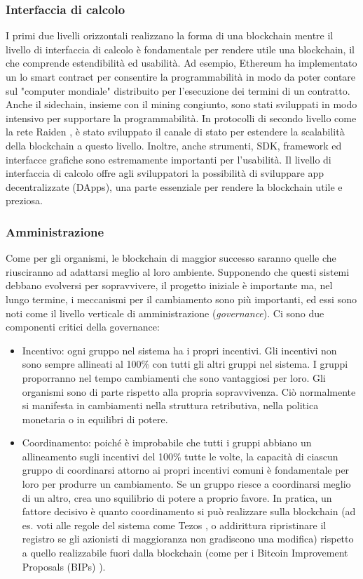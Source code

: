 \documentclass[a4paper,12pt]{article}
\begin{document}
\subsubsection{Interfaccia di calcolo}
I primi due livelli orizzontali realizzano la forma di una blockchain mentre il livello di interfaccia di calcolo è fondamentale per rendere utile una blockchain, il che comprende estendibilità ed usabilità. Ad esempio, Ethereum ha implementato un lo smart contract per
consentire la programmabilità in modo da poter contare sul "computer mondiale" distribuito per l'esecuzione dei termini di un contratto. Anche il sidechain, insieme con il mining congiunto, sono stati sviluppati in modo intensivo per supportare la programmabilità. In protocolli di secondo livello come la rete Raiden \cite{25}, è stato sviluppato il canale di stato per estendere la scalabilità della blockchain a questo livello. Inoltre, anche strumenti, SDK, framework ed interfacce grafiche sono
estremamente importanti per l'usabilità. Il livello di interfaccia di calcolo offre agli sviluppatori la possibilità di sviluppare app decentralizzate (DApps), una parte essenziale per rendere la blockchain utile e preziosa.

\subsubsection{Amministrazione}
Come per gli organismi, le blockchain di maggior successo saranno quelle che riusciranno ad adattarsi meglio al loro ambiente. Supponendo che questi sistemi debbano evolversi per sopravvivere, il progetto iniziale è importante ma, nel lungo termine, i meccanismi per il cambiamento
sono più importanti, ed essi sono noti come il livello verticale di amministrazione (\emph{governance}). Ci sono due componenti critici della governance:
\begin{itemize}
	\item
	      Incentivo: ogni gruppo nel sistema ha i propri incentivi. Gli incentivi non sono sempre allineati al 100\% con tutti gli altri gruppi nel sistema. I gruppi proporranno nel tempo cambiamenti che sono vantaggiosi per loro. Gli organismi sono di parte rispetto alla propria sopravvivenza. Ciò normalmente si manifesta in cambiamenti nella struttura retributiva, nella politica monetaria o in equilibri di potere.

	\item
	      Coordinamento: poiché è improbabile che tutti i gruppi abbiano un allineamento sugli incentivi del 100\% tutte le volte, la capacità di ciascun gruppo di coordinarsi attorno ai propri incentivi comuni è fondamentale per loro per produrre un cambiamento. Se un gruppo riesce a  coordinarsi meglio di un altro, crea uno squilibrio di potere a proprio favore. In pratica, un fattore decisivo è quanto coordinamento si può realizzare sulla blockchain (ad es. voti alle regole del sistema come Tezos \cite{34}, o addirittura ripristinare il registro se gli azionisti di maggioranza non gradiscono una modifica) rispetto a quello realizzabile fuori dalla blockchain (come per i Bitcoin Improvement Proposals (BIPs)
	      \cite{3}).

\end{itemize}
\end{document}
